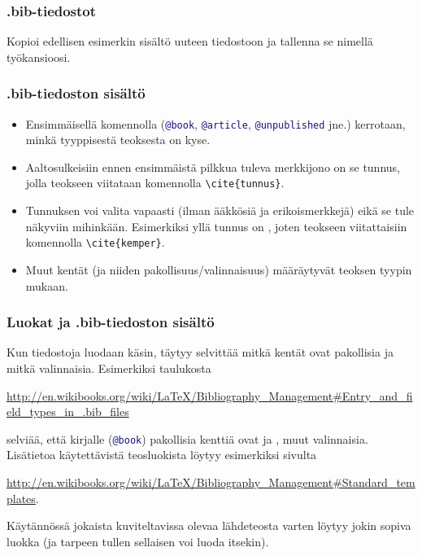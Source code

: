 \begin{fframe}
    \frametitle{.bib-tiedostot}
    \begin{harj}
        Kopioi edellisen esimerkin sisältö uuteen tiedostoon ja tallenna se nimellä  työkansioosi. 
    \end{harj}
\end{fframe}

\begin{fframe}
    \frametitle{.bib-tiedoston sisältö}
    \begin{itemize}[<+->]
        \item Ensimmäisellä komennolla (\lstinline[language=BibTeX]-@book-, \lstinline[language=BibTeX]-@article-, \lstinline[language=BibTeX]-@unpublished- jne.) kerrotaan, minkä tyyppisestä teoksesta on kyse. 
        \item Aaltosulkeisiin ennen ensimmäistä pilkkua tuleva merkkijono on se tunnus, jolla teokseen viitataan komennolla \lstinline-\cite{tunnus}-. 
        \item Tunnuksen voi valita vapaasti (ilman ääkkösiä ja erikoismerkkejä) eikä se tule näkyviin mihinkään.  Esimerkiksi yllä tunnus on , joten teokseen viitattaisiin komennolla \lstinline-\cite{kemper}-.
        \item Muut kentät (ja niiden pakollisuus/valinnaisuus) määräytyvät teoksen tyypin mukaan.
    \end{itemize}
\end{fframe}

\begin{fframe}
    \frametitle{Luokat ja .bib-tiedoston sisältö}
    Kun tiedostoja luodaan käsin, täytyy selvittää mitkä kentät ovat pakollisia ja mitkä valinnaisia. 
    \vaihto
    Esimerkiksi taulukosta 
    \begin{scriptsize}
        \url{http://en.wikibooks.org/wiki/LaTeX/Bibliography_Management#Entry_and_field_types_in_.bib_files}
    \end{scriptsize}
    selviää, että kirjalle (\lstinline[language=BibTeX]-@book-) pakollisia kenttiä ovat  ja , muut valinnaisia.
    \pause
    \vaihto
    Lisätietoa käytettävistä teosluokista löytyy esimerkiksi sivulta
    \begin{scriptsize}
        \url{http://en.wikibooks.org/wiki/LaTeX/Bibliography_Management#Standard_templates}.
    \end{scriptsize}
    \vaihto
    Käytännössä jokaista kuviteltavissa olevaa lähdeteosta varten löytyy jokin sopiva luokka (ja tarpeen tullen sellaisen voi luoda itsekin).
\end{fframe}

